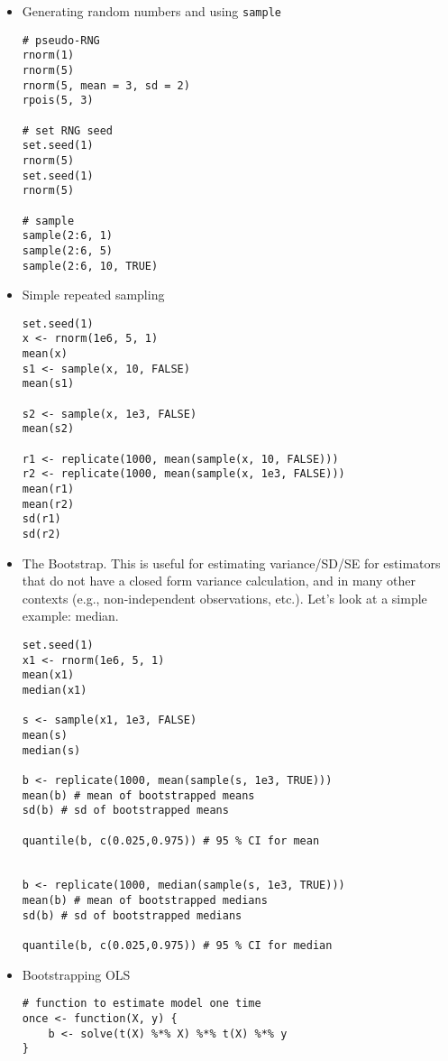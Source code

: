 \documentclass[a4paper,12pt]{article}
\begin{document}
\begin{itemize}

\item Generating random numbers and using \texttt{sample}

\begin{lstlisting}
# pseudo-RNG
rnorm(1)
rnorm(5)
rnorm(5, mean = 3, sd = 2)
rpois(5, 3)

# set RNG seed
set.seed(1)
rnorm(5)
set.seed(1)
rnorm(5)

# sample
sample(2:6, 1)
sample(2:6, 5)
sample(2:6, 10, TRUE)
\end{lstlisting}

\item Simple repeated sampling

\begin{lstlisting}
set.seed(1)
x <- rnorm(1e6, 5, 1)
mean(x)
s1 <- sample(x, 10, FALSE)
mean(s1)

s2 <- sample(x, 1e3, FALSE)
mean(s2)

r1 <- replicate(1000, mean(sample(x, 10, FALSE)))
r2 <- replicate(1000, mean(sample(x, 1e3, FALSE)))
mean(r1)
mean(r2)
sd(r1)
sd(r2)
\end{lstlisting}

\item The Bootstrap. This is useful for estimating variance/SD/SE for estimators that do not have a closed form variance calculation, and in many other contexts (e.g., non-independent observations, etc.). Let's look at a simple example: median.

\begin{lstlisting}
set.seed(1)
x1 <- rnorm(1e6, 5, 1)
mean(x1)
median(x1)

s <- sample(x1, 1e3, FALSE)
mean(s)
median(s)

b <- replicate(1000, mean(sample(s, 1e3, TRUE)))
mean(b) # mean of bootstrapped means
sd(b) # sd of bootstrapped means

quantile(b, c(0.025,0.975)) # 95 % CI for mean


b <- replicate(1000, median(sample(s, 1e3, TRUE)))
mean(b) # mean of bootstrapped medians
sd(b) # sd of bootstrapped medians

quantile(b, c(0.025,0.975)) # 95 % CI for median
\end{lstlisting}



\item Bootstrapping OLS

\begin{lstlisting}
# function to estimate model one time
once <- function(X, y) {
    b <- solve(t(X) %*% X) %*% t(X) %*% y
}


\end{lstlisting}
\end{itemize}
\end{document}
